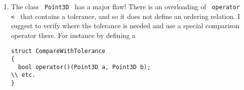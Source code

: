 \documentclass{article}
\newcommand{\li}{\lstinline}
\newcommand{\cpp}[1]{\li! #1 !}
\begin{document}
\begin{enumerate}
\item The class \cpp{Point3D} has a major flaw! There is an overloading of \cpp{operator <} that contains a tolerance, and so it does not define
an ordering relation. I suggest to verify where the tolerance is needed and use a special comparison operator there. For instance by defining a
\begin{lstlisting}
struct CompareWithTolerance
{
  bool operator()(Point3D a, Point3D b);
\\ etc.
}
\end{lstlisting}
\end{enumerate}
\end{document}
